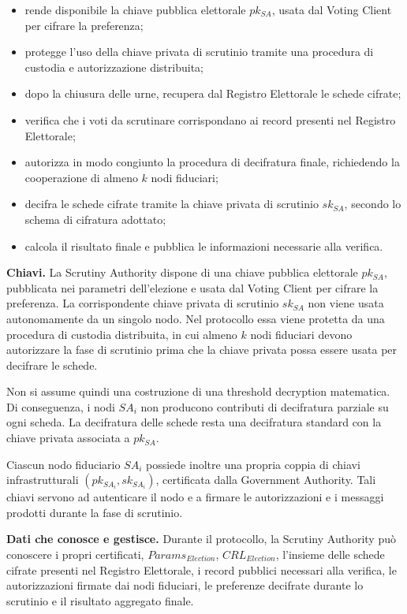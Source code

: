 \documentclass[a4paper,12pt]{article}
\begin{document}
\begin{itemize}
	\item rende disponibile la chiave pubblica elettorale \(pk_{SA}\), usata dal Voting Client per cifrare la preferenza;
	\item protegge l'uso della chiave privata di scrutinio tramite una procedura di custodia e autorizzazione distribuita;
	\item dopo la chiusura delle urne, recupera dal Registro Elettorale le schede cifrate;
	\item verifica che i voti da scrutinare corrispondano ai record presenti nel Registro Elettorale;
	\item autorizza in modo congiunto la procedura di decifratura finale, richiedendo la cooperazione di almeno \(k\) nodi fiduciari;
	\item decifra le schede cifrate tramite la chiave privata di scrutinio \(sk_{SA}\), secondo lo schema di cifratura adottato;
	\item calcola il risultato finale e pubblica le informazioni necessarie alla verifica.
\end{itemize}

\textbf{Chiavi.}
La Scrutiny Authority dispone di una chiave pubblica elettorale \(pk_{SA}\), pubblicata nei parametri dell'elezione e usata dal Voting Client per cifrare la preferenza.
La corrispondente chiave privata di scrutinio \(sk_{SA}\) non viene usata autonomamente da un singolo nodo.
Nel protocollo essa viene protetta da una procedura di custodia distribuita, in cui almeno \(k\) nodi fiduciari devono autorizzare la fase di scrutinio prima che la chiave privata possa essere usata per decifrare le schede.

Non si assume quindi una costruzione di una threshold decryption matematica.
Di conseguenza, i nodi \(SA_i\) non producono contributi di decifratura parziale su ogni scheda.
La decifratura delle schede resta una decifratura standard con la chiave privata associata a \(pk_{SA}\).

Ciascun nodo fiduciario \(SA_i\) possiede inoltre una propria coppia di chiavi infrastrutturali \((pk_{SA_i}, sk_{SA_i})\), certificata dalla Government Authority.
Tali chiavi servono ad autenticare il nodo e a firmare le autorizzazioni e i messaggi prodotti durante la fase di scrutinio.

\textbf{Dati che conosce e gestisce.}
Durante il protocollo, la Scrutiny Authority pu\`o conoscere i propri certificati, \(Params_{Election}\), \(CRL_{Election}\), l'insieme delle schede cifrate presenti nel Registro Elettorale, i record pubblici necessari alla verifica, le autorizzazioni firmate dai nodi fiduciari, le preferenze decifrate durante lo scrutinio e il risultato aggregato finale.
\end{document}
